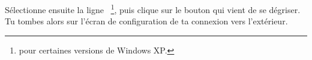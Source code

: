 





S\'electionne ensuite la ligne ~\footnote{ pour certaines versions de Windows XP.},
puis clique sur le bouton  qui vient de se
d\'egriser. Tu tombes alors sur l'\'ecran de configuration de ta
connexion vers l'ext\'erieur.

